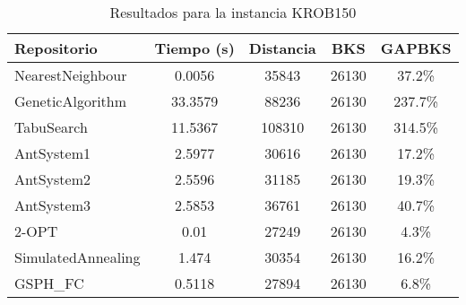 \begin{table}[H]
\centering
\caption{Resultados para la instancia KROB150}
\begin{tabular}{|l|c|c|c|c|}
\hline
\textbf{Repositorio} & \textbf{Tiempo (s)} & \textbf{Distancia} & \textbf{BKS} & \textbf{GAPBKS} \\ 
\hline
NearestNeighbour & 0.0056 & 35843 & 26130 & 37.2\% \\ 
GeneticAlgorithm & 33.3579 & 88236 & 26130 & 237.7\% \\ 
TabuSearch & 11.5367 & 108310 & 26130 & 314.5\% \\ 
AntSystem1 & 2.5977 & 30616 & 26130 & 17.2\% \\ 
AntSystem2 & 2.5596 & 31185 & 26130 & 19.3\% \\ 
AntSystem3 & 2.5853 & 36761 & 26130 & 40.7\% \\ 
2-OPT & 0.01 & 27249 & 26130 & 4.3\% \\ 
SimulatedAnnealing & 1.474 & 30354 & 26130 & 16.2\% \\ 
GSPH_FC & 0.5118 & 27894 & 26130 & 6.8\% \\ 
\hline
\end{tabular}
\end{table}
